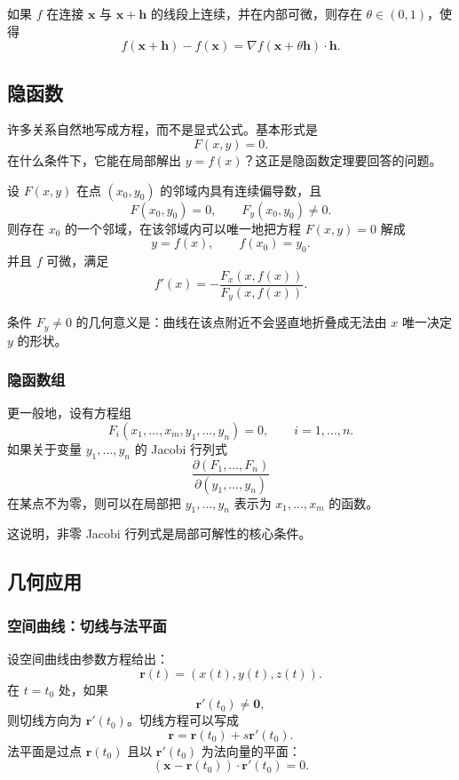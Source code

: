 \begin{theorem}[中值公式]
如果 $f$ 在连接 $\mathbf{x}$ 与 $\mathbf{x}+\mathbf{h}$ 的线段上连续，并在内部可微，则存在 $\theta\in(0,1)$，使得
\[
    f(\mathbf{x}+\mathbf{h})-f(\mathbf{x})
    =\nabla f(\mathbf{x}+\theta\mathbf{h})\cdot\mathbf{h}.
\]
\end{theorem}

\subsection{隐函数}

许多关系自然地写成方程，而不是显式公式。基本形式是
\[
    F(x,y)=0.
\]
在什么条件下，它能在局部解出 $y=f(x)$？这正是隐函数定理要回答的问题。

\begin{theorem}
设 $F(x,y)$ 在点 $(x_0,y_0)$ 的邻域内具有连续偏导数，且
\[
    F(x_0,y_0)=0,
    \qquad
    F_y(x_0,y_0)\neq0.
\]
则存在 $x_0$ 的一个邻域，在该邻域内可以唯一地把方程 $F(x,y)=0$ 解成
\[
    y=f(x),
    \qquad f(x_0)=y_0.
\]
并且 $f$ 可微，满足
\[
    f'(x)=-\frac{F_x(x,f(x))}{F_y(x,f(x))}.
\]
\end{theorem}

条件 $F_y\neq0$ 的几何意义是：曲线在该点附近不会竖直地折叠成无法由 $x$ 唯一决定 $y$ 的形状。

\subsubsection{隐函数组}

更一般地，设有方程组
\[
    F_i(x_1,\dots,x_m,y_1,\dots,y_n)=0,
    \qquad i=1,\dots,n.
\]
如果关于变量 $y_1,\dots,y_n$ 的 Jacobi 行列式
\[
    \frac{\partial(F_1,\dots,F_n)}{\partial(y_1,\dots,y_n)}
\]
在某点不为零，则可以在局部把 $y_1,\dots,y_n$ 表示为 $x_1,\dots,x_m$ 的函数。

这说明，非零 Jacobi 行列式是局部可解性的核心条件。

\subsection{几何应用}

\subsubsection{空间曲线：切线与法平面}

设空间曲线由参数方程给出：
\[
    \mathbf{r}(t)=(x(t),y(t),z(t)).
\]
在 $t=t_0$ 处，如果
\[
    \mathbf{r}'(t_0)\neq\mathbf{0},
\]
则切线方向为 $\mathbf{r}'(t_0)$。切线方程可以写成
\[
    \mathbf{r}=\mathbf{r}(t_0)+s\mathbf{r}'(t_0).
\]
法平面是过点 $\mathbf{r}(t_0)$ 且以 $\mathbf{r}'(t_0)$ 为法向量的平面：
\[
    (\mathbf{x}-\mathbf{r}(t_0))\cdot\mathbf{r}'(t_0)=0.
\]

